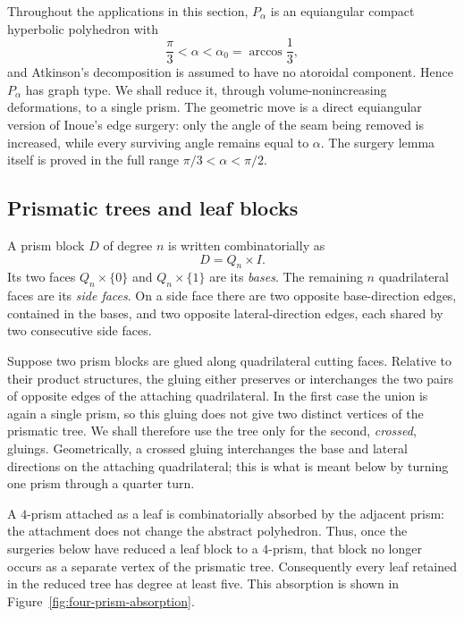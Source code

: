 \documentclass[12pt,a4paper]{article}
\theoremstyle{definition}
\begin{document}
Throughout the applications in this section, \(P_\alpha\) is an equiangular
compact hyperbolic polyhedron with
\[
        \frac{\pi}{3}<\alpha<\alpha_0=\arccos\frac13,
\]
and Atkinson's decomposition is assumed to have no atoroidal component. Hence
\(P_\alpha\) has graph type. We shall reduce it, through volume-nonincreasing
deformations, to a single prism. The geometric move is a direct equiangular
version of Inoue's edge surgery: only the angle of the seam being removed is
increased, while every surviving angle remains equal to \(\alpha\).  The
surgery lemma itself is proved in the full range
\(\pi/3<\alpha<\pi/2\).

\subsection{Prismatic trees and leaf blocks}

A prism block \(D\) of degree \(n\) is written combinatorially as
\[
        D=Q_n\times I.
\]
Its two faces \(Q_n\times\{0\}\) and \(Q_n\times\{1\}\) are its \emph{bases}.
The remaining \(n\) quadrilateral faces are its \emph{side faces}. On a side
face there are two opposite base-direction edges, contained in the bases, and
two opposite lateral-direction edges, each shared by two consecutive side
faces.

Suppose two prism blocks are glued along quadrilateral cutting faces. Relative
to their product structures, the gluing either preserves or interchanges the
two pairs of opposite edges of the attaching quadrilateral. In the first case
the union is again a single prism, so this gluing does not give two distinct
vertices of the prismatic tree. We shall therefore use the tree only for the
second, \emph{crossed}, gluings. Geometrically, a crossed gluing interchanges
the base and lateral directions on the attaching quadrilateral; this is what
is meant below by turning one prism through a quarter turn.

A \(4\)-prism attached as a leaf is combinatorially absorbed by the adjacent
prism: the attachment does not change the abstract polyhedron. Thus, once the
surgeries below have reduced a leaf block to a \(4\)-prism, that block no
longer occurs as a separate vertex of the prismatic tree.
Consequently every leaf retained in the reduced tree has degree at least five.
This absorption is shown in Figure~\ref{fig:four-prism-absorption}.
\end{document}
